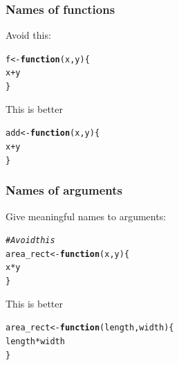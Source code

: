 \documentclass[12pt]{beamer}\usepackage[]{graphicx}\usepackage[]{color}
\makeatletter
\newcommand{\hlcom}[1]{\textcolor[rgb]{0.678,0.584,0.686}{\textit{#1}}}%
\newcommand{\hlopt}[1]{\textcolor[rgb]{0,0,0}{#1}}%
\newcommand{\hlstd}[1]{\textcolor[rgb]{0.345,0.345,0.345}{#1}}%
\newcommand{\hlkwa}[1]{\textcolor[rgb]{0.161,0.373,0.58}{\textbf{#1}}}%
\newcommand{\hlkwb}[1]{\textcolor[rgb]{0.69,0.353,0.396}{#1}}%
\newcommand{\hlkwc}[1]{\textcolor[rgb]{0.333,0.667,0.333}{#1}}%
\newenvironment{kframe}{%
 \def\at@end@of@kframe{}%
 \ifinner\ifhmode%
  \def\at@end@of@kframe{\end{minipage}}%
  \begin{minipage}{\columnwidth}%
 \fi\fi%
 \def\FrameCommand##1{\hskip\@totalleftmargin \hskip-\fboxsep
 \colorbox{shadecolor}{##1}\hskip-\fboxsep
     \hskip-\linewidth \hskip-\@totalleftmargin \hskip\columnwidth}%
 \MakeFramed {\advance\hsize-\width
   \@totalleftmargin\z@ \linewidth\hsize
   \@setminipage}}%
 {\par\unskip\endMakeFramed%
 \at@end@of@kframe}
\newenvironment{knitrout}{}{} %
\makeatother
\begin{document}
\begin{frame}[fragile]
\frametitle{Names of functions}

Avoid this:
\begin{knitrout}\footnotesize
{}\color{fgcolor}\begin{kframe}
\begin{alltt}
\hlstd{f} \hlkwb{<-} \hlkwa{function}\hlstd{(}\hlkwc{x}\hlstd{,} \hlkwc{y}\hlstd{) \{}
  \hlstd{x} \hlopt{+} \hlstd{y}
\hlstd{\}}
\end{alltt}
\end{kframe}
\end{knitrout}

This is better
\begin{knitrout}\footnotesize
{}\color{fgcolor}\begin{kframe}
\begin{alltt}
\hlstd{add} \hlkwb{<-} \hlkwa{function}\hlstd{(}\hlkwc{x}\hlstd{,} \hlkwc{y}\hlstd{) \{}
  \hlstd{x} \hlopt{+} \hlstd{y}
\hlstd{\}}
\end{alltt}
\end{kframe}
\end{knitrout}

\end{frame}


\begin{frame}[fragile]
\frametitle{Names of arguments}

Give meaningful names to arguments:
\begin{knitrout}\footnotesize
{}\color{fgcolor}\begin{kframe}
\begin{alltt}
\hlcom{# Avoid this}
\hlstd{area_rect} \hlkwb{<-} \hlkwa{function}\hlstd{(}\hlkwc{x}\hlstd{,} \hlkwc{y}\hlstd{) \{}
  \hlstd{x} \hlopt{*} \hlstd{y}
\hlstd{\}}
\end{alltt}
\end{kframe}
\end{knitrout}

This is better
\begin{knitrout}\footnotesize
{}\color{fgcolor}\begin{kframe}
\begin{alltt}
\hlstd{area_rect} \hlkwb{<-} \hlkwa{function}\hlstd{(}\hlkwc{length}\hlstd{,} \hlkwc{width}\hlstd{) \{}
  \hlstd{length} \hlopt{*} \hlstd{width}
\hlstd{\}}
\end{alltt}
\end{kframe}
\end{knitrout}

\end{frame}
\end{document}
